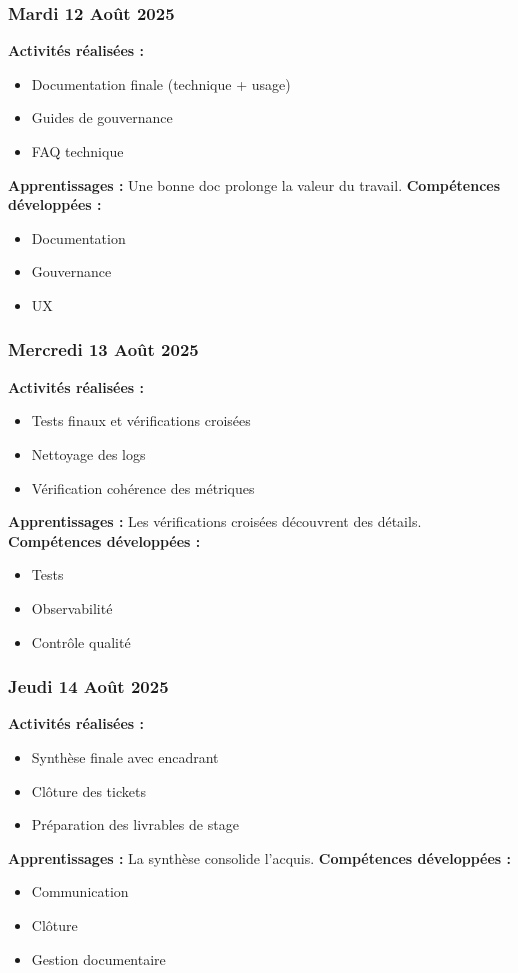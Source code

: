 \documentclass[12pt,a4paper]{article}
\begin{document}
\subsubsection{Mardi 12 Août 2025}
\textbf{Activités réalisées :}
\begin{itemize}
    \item Documentation finale (technique + usage)
    \item Guides de gouvernance
    \item FAQ technique
\end{itemize}
\textbf{Apprentissages :} Une bonne doc prolonge la valeur du travail.
\textbf{Compétences développées :}
\begin{itemize}
    \item Documentation
    \item Gouvernance
    \item UX
\end{itemize}

\subsubsection{Mercredi 13 Août 2025}
\textbf{Activités réalisées :}
\begin{itemize}
    \item Tests finaux et vérifications croisées
    \item Nettoyage des logs
    \item Vérification cohérence des métriques
\end{itemize}
\textbf{Apprentissages :} Les vérifications croisées découvrent des détails.
\textbf{Compétences développées :}
\begin{itemize}
    \item Tests
    \item Observabilité
    \item Contrôle qualité
\end{itemize}

\subsubsection{Jeudi 14 Août 2025}
\textbf{Activités réalisées :}
\begin{itemize}
    \item Synthèse finale avec encadrant
    \item Clôture des tickets
    \item Préparation des livrables de stage
\end{itemize}
\textbf{Apprentissages :} La synthèse consolide l'acquis.
\textbf{Compétences développées :}
\begin{itemize}
    \item Communication
    \item Clôture
    \item Gestion documentaire
\end{itemize}
\end{document}
